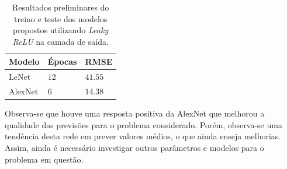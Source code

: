 \begin{table}[!ht]
     \caption{Resultados preliminares do treino e teste dos modelos propostos utilizando \emph{Leaky ReLU} na camada de saída.}
     \label{tab:results_leaky}
     \centering
     \begin{tabular}{l l l}
          \toprule
          Modelo & Épocas & RMSE \\
          \midrule
          LeNet & $12$ & $41.55$ \\
          AlexNet & $6$ & $14.38$\\
          \bottomrule
     \end{tabular}
\end{table}

Observa-se que houve uma resposta positiva da AlexNet que melhorou a qualidade das previsões para o problema considerado. Porém, observa-se uma tendência desta rede em prever valores médios, o que ainda enseja melhorias. Assim, ainda é necessário investigar outros parâmetros e modelos para o problema em questão.


